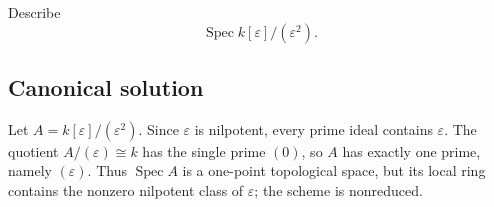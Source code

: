 
\begin{exercise}
	Describe
	\[
	\operatorname{Spec} k[\varepsilon]/(\varepsilon^2).
	\]
\end{exercise}

\subsection*{Canonical solution}
Let $A=k[\varepsilon]/(\varepsilon^2)$. Since $\varepsilon$ is nilpotent, every prime ideal contains $\varepsilon$. The quotient $A/(\varepsilon)\cong k$ has the single prime $(0)$, so $A$ has exactly one prime, namely $(\varepsilon)$. Thus $\operatorname{Spec} A$ is a one-point topological space, but its local ring contains the nonzero nilpotent class of $\varepsilon$; the scheme is nonreduced.
